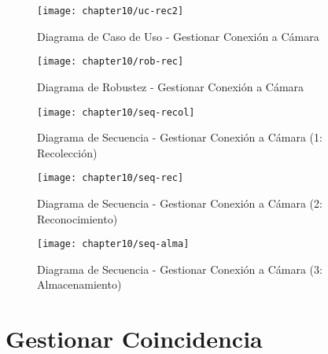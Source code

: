     \begin{figure}[H]
        \centering
        \texttt{[image: chapter10/uc-rec2]}
        \caption{Diagrama de Caso de Uso - Gestionar Conexión a Cámara}
        \label{fig:uc-rec}
    \end{figure}
    \begin{landscape}
        
    \begin{figure}[H]
        \centering
        \texttt{[image: chapter10/rob-rec]}
        \caption{ Diagrama de Robustez - Gestionar Conexión a Cámara}
        \label{fig:rob-rec}
    \end{figure}
       \end{landscape}    \begin{landscape}
 \begin{figure}[H]
        \centering
        \texttt{[image: chapter10/seq-recol]}
        \caption{Diagrama de Secuencia - Gestionar Conexión a Cámara (1: Recolección)}
        \label{fig:seq-recol}
    \end{figure}
        \end{landscape}   \begin{landscape}
    \begin{figure}[H]
        \centering
        \texttt{[image: chapter10/seq-rec]}
        \caption{Diagrama de Secuencia - Gestionar Conexión a Cámara (2: Reconocimiento)  }
        \label{fig:seq-rec}
    \end{figure}
       \end{landscape}    \begin{landscape}
    \begin{figure}[H]
        \centering
        \texttt{[image: chapter10/seq-alma]}
        \caption{Diagrama de Secuencia - Gestionar Conexión a Cámara (3: Almacenamiento)  }
        \label{fig:seq-alma}
    \end{figure}
    \end{landscape}    
    
\section{Gestionar Coincidencia}

